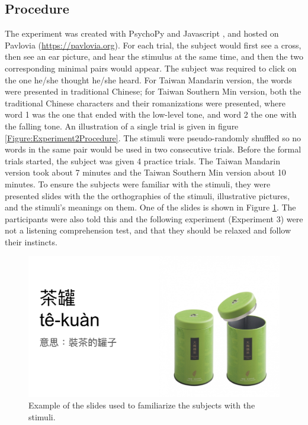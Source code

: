 \subsection{Procedure}
The experiment was created with PsychoPy \citep{Peirce2019} and Javascript \citep{Flanagan2006}, and hosted on Pavlovia (\url{https://pavlovia.org}). For each trial, the subject would first see a cross, then see an ear picture, and hear the stimulus at the same time, and then the two corresponding minimal pairs would appear. The subject was required to click on the one he/she thought he/she heard. For Taiwan Mandarin version, the words were presented in traditional Chinese; for Taiwan Southern Min version, both the traditional Chinese characters and their romanizations were presented, where word 1 was the one that ended with the low-level tone, and word 2 the one with the falling tone. An illustration of a single trial is given in figure  \ref{Figure:Experiment2Procedure}. The stimuli were pseudo-randomly shuffled so no words in the same pair would be used in two consecutive trials. Before the formal trials started, the subject was given 4 practice trials. The Taiwan Mandarin version took about 7 minutes and the Taiwan Southern Min version about 10 minutes. To ensure the subjects were familiar with the stimuli, they were presented slides with the the orthographies of the stimuli, illustrative pictures, and the stimuli's meanings on them. One of the slides is shown in Figure \ref{Figure:Experiment2SlideExample}. The participants were also told this and the following experiment (Experiment 3) were not a listening comprehension test, and that they should be relaxed and follow their instincts.

\begin{figure}[h]
\centering
\includegraphics[width=.7\textwidth]{figures/E2/SlideExample.jpg}
\caption{Example of the slides used to familiarize the subjects with the stimuli.}
\label{Figure:Experiment2SlideExample}
\end{figure}


